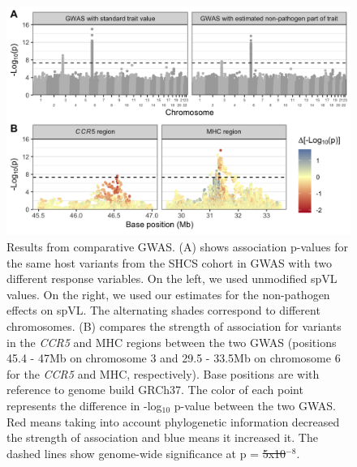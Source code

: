 \documentclass[11pt]{article} %
\providecommand{\DIFadd}[1]{{\protect\color{blue}\uwave{#1}}} %
\providecommand{\DIFdel}[1]{{\protect\color{red}\sout{#1}}}                      %
\providecommand{\DIFaddFL}[1]{\DIFadd{#1}} %
\providecommand{\DIFdelFL}[1]{\DIFdel{#1}} %
\providecommand{\DIFaddbeginFL}{} %
\providecommand{\DIFaddendFL}{} %
\providecommand{\DIFdelbeginFL}{} %
\providecommand{\DIFdelendFL}{} %
\newcommand{\DIFscaledelfig}{0.5}
\newlength{\DIFdelgraphicswidth} %
\newlength{\DIFdelgraphicsheight} %
\newcommand{\DIFaddincludegraphics}[2][]{{\color{blue}\fbox{\DIFOincludegraphics[#1]{#2}}}} %
\newcommand{\DIFdelincludegraphics}[2][]{%
\sbox{\DIFdelgraphicsbox}{\DIFOincludegraphics[#1]{#2}}%
\settoboxwidth{\DIFdelgraphicswidth}{\DIFdelgraphicsbox} %
\settoboxtotalheight{\DIFdelgraphicsheight}{\DIFdelgraphicsbox} %
\scalebox{\DIFscaledelfig}{%
\parbox[b]{\DIFdelgraphicswidth}{\usebox{\DIFdelgraphicsbox}\\[-\baselineskip] \rule{\DIFdelgraphicswidth}{0em}}\llap{\resizebox{\DIFdelgraphicswidth}{\DIFdelgraphicsheight}{%
\setlength{\unitlength}{\DIFdelgraphicswidth}%
\begin{picture}(1,1)%
\thicklines\linethickness{2pt} %
{\color[rgb]{1,0,0}\put(0,0){\framebox(1,1){}}}%
{\color[rgb]{1,0,0}\put(0,0){\line( 1,1){1}}}%
{\color[rgb]{1,0,0}\put(0,1){\line(1,-1){1}}}%
\end{picture}%
}\hspace*{3pt}}} %
} %
\DeclareRobustCommand{\DIFaddbeginFL}{\DIFOaddbeginFL \let\includegraphics\DIFaddincludegraphics} %
\DeclareRobustCommand{\DIFaddendFL}{\DIFOaddendFL \let\includegraphics\DIFOincludegraphics} %
\DeclareRobustCommand{\DIFdelbeginFL}{\DIFOdelbeginFL \let\includegraphics\DIFdelincludegraphics} %
\DeclareRobustCommand{\DIFdelendFL}{\DIFOaddendFL \let\includegraphics\DIFOincludegraphics} %
\begin{document}
\begin{linenumbers}
\begin{figure}[H]
	\begin{center}
		\includegraphics[width=\linewidth]{figures/gwas_results}
		\caption{Results from comparative GWAS. (A) shows association p-values for the same host variants from the SHCS cohort in GWAS with two different response variables. On the left, we used unmodified \DIFaddbeginFL \DIFaddFL{(total) }\DIFaddendFL spVL values. On the right, we used our estimates for the non-pathogen effects on spVL. The alternating shades correspond to different chromosomes. (B) compares the strength of association for variants in the \emph{CCR5} and MHC regions between the two GWAS (positions 45.4 - 47Mb on chromosome 3 and 29.5 - 33.5Mb on chromosome 6 for the \emph{CCR5} and MHC, respectively). Base positions are with reference to genome build GRCh37. The color of each point represents the difference in -log$_{10}$ p-value between the two GWAS. Red means taking into account phylogenetic information decreased the strength of association and blue means it increased it. The dashed lines show genome-wide significance at p = \DIFdelbeginFL \DIFdelFL{5x10$^{-8}$}\DIFdelendFL \DIFaddbeginFL \DIFaddFL{$5 \times 10^{-8}$}\DIFaddendFL .}
		\label{fig:gwas-results}
	\end{center}
\end{figure}


\end{linenumbers}
\end{document}
